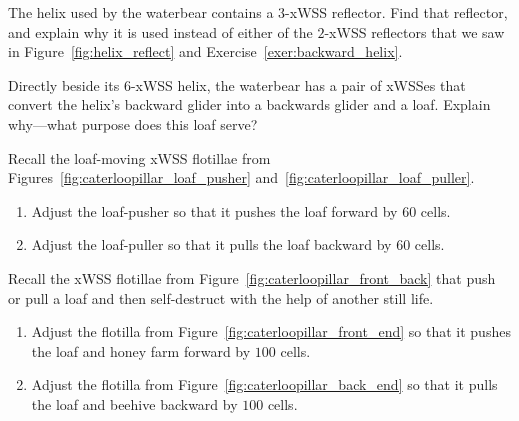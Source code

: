 \begin{multicols}{2}
\mfilbreak


\begin{problemstar}\label{exer:waterbear_one_more_helix_component}
	The helix used by the waterbear contains a $3$-xWSS reflector. Find that reflector, and explain why it is used instead of either of the $2$-xWSS reflectors that we saw in Figure~\ref{fig:helix_reflect} and Exercise~\ref{exer:backward_helix}.
\end{problemstar}


\mfilbreak


\begin{problemstar}\label{exer:waterbear_why_loaf}
	Directly beside its $6$-xWSS helix, the waterbear has a pair of xWSSes that convert the helix's backward glider into a backwards glider and a loaf. Explain why---what purpose does this loaf serve?
\end{problemstar}


\mfilbreak


\begin{problem}\label{exer:loaf_move_adjust}
	Recall the loaf-moving xWSS flotillae from Figures~\ref{fig:caterloopillar_loaf_pusher} and~\ref{fig:caterloopillar_loaf_puller}.\smallskip
	
	\begin{enumerate}[label=\bf\color{ocre}(\alph*)]
		\item Adjust the loaf-pusher so that it pushes the loaf forward by $60$ cells.
		
		\item Adjust the loaf-puller so that it pulls the loaf backward by $60$ cells.
	\end{enumerate}
\end{problem}


\mfilbreak


\begin{problem}\label{exer:loaf_move_and_destroy_adjust}
	Recall the xWSS flotillae from Figure~\ref{fig:caterloopillar_front_back} that push or pull a loaf and then self-destruct with the help of another still life.\smallskip
	
	\begin{enumerate}[label=\bf\color{ocre}(\alph*)]
		\item Adjust the flotilla from Figure~\ref{fig:caterloopillar_front_end} so that it pushes the loaf and honey farm forward by $100$ cells.
		
		\item Adjust the flotilla from Figure~\ref{fig:caterloopillar_back_end} so that it pulls the loaf and beehive backward by $100$ cells.
	\end{enumerate}
\end{problem}



\end{multicols}
